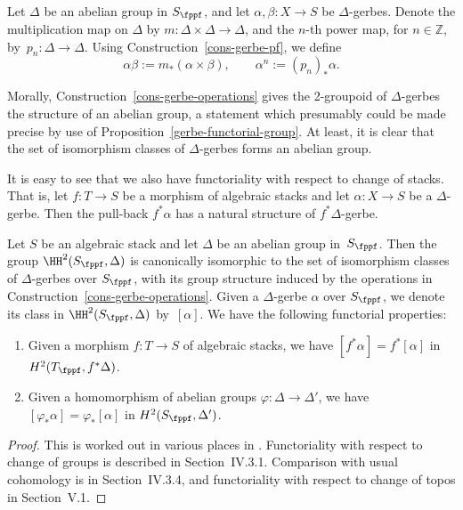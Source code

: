 \begin{construction}
\label{cons-gerbe-operations}
Let $\Delta$ be an abelian group in $S_\fppf$,
and let $\alpha, \beta\colon X \to S$ be $\Delta$-gerbes.
Denote the multiplication map on $\Delta$ by $m\colon \Delta \times \Delta \to \Delta$,
and the $n$-th power map, for $n\in \mathbb{Z}$, by~$p_n\colon \Delta \to \Delta$.
Using Construction~\ref{cons-gerbe-pf}, we define
\begin{equation}
\label{eq-gerbe-mult-inverse}
\alpha\beta := m_*(\alpha \times \beta), \qquad
\alpha^n := (p_n)_*\alpha.
\end{equation}
\end{construction}
Morally, Construction~\ref{cons-gerbe-operations} gives the 2-groupoid of $\Delta$-gerbes
the structure of an abelian group,
a statement which presumably could be made precise by use of Proposition~\ref{gerbe-functorial-group}.
At least, it is clear that the set of isomorphism classes of $\Delta$-gerbes forms an abelian group.

It is easy to see that we also have functoriality with respect to change of stacks.
That is, let $f\colon T \to S$ be a morphism of algebraic stacks
and let $\alpha\colon X \to S$ be a $\Delta$-gerbe.
Then the pull-back $f^*\alpha$ has a natural structure of $f^*\Delta$-gerbe.

\begin{theorem}[Giraud]
\label{t:gerbes-H2}
Let $S$ be an algebraic stack and let $\Delta$ be an abelian group in~$S_\fppf$.
Then the group $\HH^2(S_\fppf, \Delta)$ is canonically isomorphic to the set of isomorphism
classes of $\Delta$-gerbes over $S_\fppf$,
with its group structure induced by the operations in Construction~\ref{cons-gerbe-operations}.
Given a $\Delta$-gerbe $\alpha$ over $S_\fppf$,
we denote its class in $\HH^2(S_\fppf, \Delta)$ by~$[\alpha]$.
We have the following functorial properties:
\begin{enumerate}
\item
Given a morphism $f\colon T \to S$ of algebraic stacks,
we have $[f^*\alpha] = f^*[\alpha]$ in $H^2(T_\fppf, f^*\Delta)$.
\item
Given a homomorphism of abelian groups $\varphi\colon \Delta \to \Delta'$,
we have $[\varphi_\ast \alpha] = \varphi_*[\alpha]$ in $H^2(S_\fppf, \Delta')$.
\end{enumerate}
\end{theorem}
\begin{proof}
This is worked out in various places in \cite{giraud1971}.
Functoriality with respect to change of groups is described in Section~IV.3.1.
Comparison with usual cohomology is in Section~IV.3.4,
and functoriality with respect to change of topos in Section~V.1.
\end{proof}

